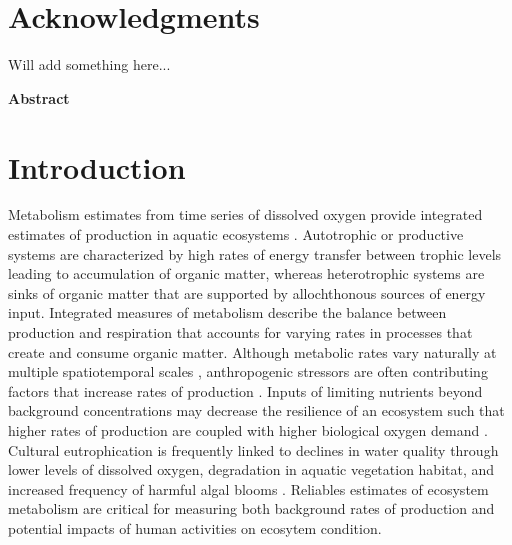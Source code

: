 \documentclass[letterpaper,12pt,oneside]{article}\usepackage[]{graphicx}\usepackage[]{color}
\begin{document}
\raggedbottom
\linenumbers
\raggedright
{}
\setlength{\parindent}{0.5in}
\renewcommand\refname{References \vspace{12pt}}



\section{Acknowledgments}

Will add something here...

\centerline{{\bf Abstract}}
\begin{singlespace} \small
\noindent 

\normalsize
\end{singlespace}

\acresetall
\clearpage

\section{Introduction} \label{intro}

Metabolism estimates from time series of dissolved oxygen provide integrated estimates of production in aquatic ecosystems \citep{Kemp12,Needoba12}.  Autotrophic or productive systems are characterized by high rates of energy transfer between trophic levels leading to accumulation of organic matter, whereas heterotrophic systems are sinks of organic matter that are supported by allochthonous sources of energy input.  Integrated measures of metabolism describe the balance between production and respiration that accounts for varying rates in processes that create and consume organic matter.  Although metabolic rates vary naturally at multiple spatiotemporal scales \citep{Ziegler98,Caffrey04,Russell07}, anthropogenic stressors are often contributing factors that increase rates of production \citep{Diaz08}.  Inputs of limiting nutrients beyond background concentrations may decrease the resilience of an ecosystem such that higher rates of production are coupled with higher biological oxygen demand \citep{Yin04,Kemp09}.  Cultural eutrophication is frequently linked to declines in water quality through lower levels of dissolved oxygen, degradation in aquatic vegetation habitat, and increased frequency of harmful algal blooms \citep{Cloern96,Short96,Rabalais02}.  Reliables estimates of ecosystem metabolism are critical for measuring both background rates of production and potential impacts of human activities on ecosytem condition.     
\end{document}
